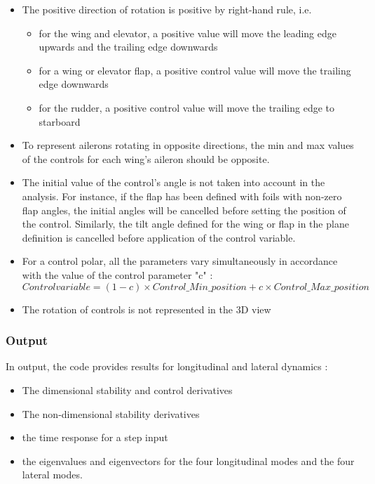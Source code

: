 \documentclass[a4paper,twoside,12pt,dvips]{article}
\begin{document}
\begin{itemize}
\item The positive direction of rotation is positive by right-hand
rule, i.e.
\begin{itemize}
\item for the wing and elevator, a positive value will move the
leading edge upwards and the trailing edge downwards
\item for a wing or elevator flap, a positive control value will move
the trailing edge downwards
\item for the rudder, a positive control value will move the trailing
edge to starboard
\end{itemize}
\item To represent ailerons rotating in opposite directions, the min
and max values of the controls for each wing's aileron should be
opposite.
\item The initial value of the control's angle is not taken into
account in the analysis. For instance, if the flap has been defined
with foils with non-zero flap angles, the initial angles will be
cancelled before setting the position of the control.\newline
Similarly, the tilt angle defined for the wing or flap in the plane
definition is cancelled before application of the control variable.
\item For a control polar, all the parameters vary simultaneously in
accordance with the value of the control parameter "c" :
$$Control variable = (1-c) \times Control\_Min\_position + c \times Control\_Max\_position$$
\item The rotation of controls is not represented in the 3D view
\end{itemize}

\subsubsection{Output}

In output, the code provides results for longitudinal and lateral
dynamics :

\begin{itemize}
\item The dimensional stability and control derivatives
\item The non-dimensional stability derivatives
\item the time response for a step input
\item the eigenvalues and eigenvectors for the four longitudinal modes
and the four lateral modes.
\end{itemize}
\end{document}
